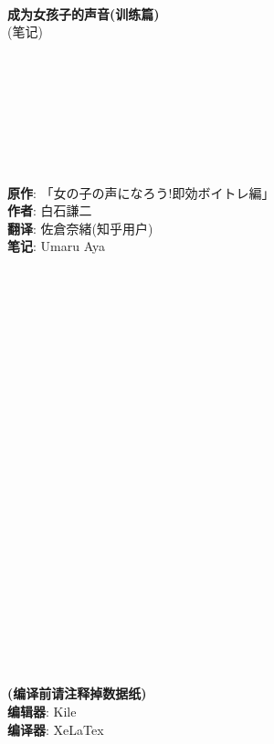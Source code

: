 


 \begin{center} 
 ~\\ ~\\ ~\\ ~\\ ~\\ ~\\ ~\\ ~\\ 
 \Large \textbf{成为女孩子的声音(训练篇)}\\
 \large (笔记)\\ ~\\ ~\\ ~\\ ~\\ ~\\ ~\\ ~\\ ~\\ 
 \large  \textbf{原作}: \mincho 「女の子の声になろう!即効ボイトレ編」\rmfamily \\ \normalsize \textbf{作者}: 白石謙二 \\
 \normalsize \textbf{翻译}: \mincho 佐倉奈緒\rmfamily (知乎用户) \\ \small \textbf{笔记}: Umaru Aya
 ~\\ ~\\ ~\\  ~\\ ~\\ ~\\  ~\\ ~\\ ~\\ ~\\ ~\\ ~\\ ~\\ ~\\ ~\\ ~\\ ~\\ ~\\~\\ ~\\ ~\\ ~\\ ~\\ ~\\ ~\\
 \normalsize \textbf{(编译前请注释掉数据纸)}\\ 
 \small \textbf{编辑器}: Kile\\ \textbf{编译器}: XeLaTex
\end{center}
  
